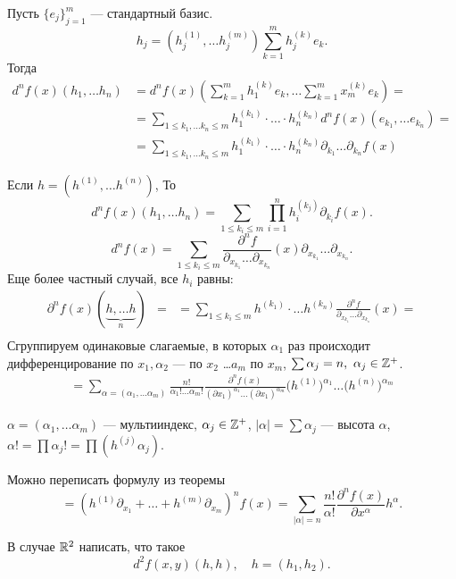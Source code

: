 \begin{thm}[частный случай, $ X = \R^{m} ~\R^{n}$]
    Пусть $ \{e_j\}_{j=1}^{m}$ --- стандартный базис.
    \[
	h_j = \left( h_j^{(1)}, \ldots h_j^{(m)} \right)  \sum_{k=1}^{m} h_{j}^{(k)} e_k 
    .\] 
    Тогда
	\[
	\begin{aligned}
	d^{n}f(x) (h_1, \ldots h_n) & = d^{n}f(x) \left( \sum_{k=1}^{m} h_1^{(k)} e_k, \ldots \sum_{k=1}^{m} x_m^{(k)}e_k \right) = \\
								&= \sum_{1 \le k_1, \ldots k_n \le m}^{} h_1^{(k_1)}\cdot  \ldots  \cdot h_n^{(k_n)} d^{n}f(x)(e_{k_1}, \ldots e_{k_n}) = \\
								&= \sum_{1 \le  k_1, \ldots k_n \le m}^{}  h_1^{(k_1)} \cdot \ldots \cdot h_n^{(k_n)} \partial _{k_1} \ldots \partial _{k_n}f(x)
	\end{aligned}
	\]
\end{thm}

\begin{thm}[еще более частный случай, $ X = \R^{m} , Y = \R, h_i = h_j$ ]
	Если $ h = (h^{(1)}, \ldots h^{(n)})$, То
    \[
		d^{n}f(x) (h_1, \ldots h_n) = \sum_{1 \le k_i \le m} \prod_{i=1}^{n} h_i^{(k_j)}\partial _{ k_i } f(x)
    .\] 
	\[
		d^{n}f(x) = \sum_{1 \le k_i \le m}^{} \frac{\partial ^{n} f}{\partial _{x_{k_1}} \ldots \partial _{x_{k_n}}} (x) \partial _{x_{k_1}} \ldots \partial _{x_{k_n}} 
	.\] 
	Еще более частный случай, все $ h_i$ равны:
	\[
	\begin{aligned}
		\partial ^{n} f(x) (\underbrace{h, \ldots h}_{n}) & = 
														  & = \sum_{1 \le k_i \le m}^{} h^{(k_1)} \cdot  \ldots h^{(k_n)}\frac{\partial ^{n} f}{\partial _{x_{k_1}} \ldots \partial _{ x_{k_n} } } (x) =\\
	\end{aligned}
    \] 
	Сгруппируем одинаковые слагаемые, в которых $ \alpha _1$ раз происходит дифференцирование по $ x_1, \alpha _2$ --- по $ x_2$  \ldots $ a_m$ по  $ x_m$, $ \sum \alpha _j = n, ~ \alpha _j \in \mathbb{Z}^{+} $.
	\[
	\begin{aligned}
=\sum_{\alpha = (\alpha _1, \ldots \alpha _m)} \frac{n!}{\alpha _1! \ldots \alpha _m!} \frac{\partial ^{n}f(x)}{(\partial x_1)^{\alpha _1} \ldots (\partial x_1)^{\alpha _m}}
\bigl(h^{(1)}\bigr)^{\alpha _1} \ldots \bigl(h^{(n)}\bigr)^{\alpha _m} 
\end{aligned}
\]
\end{thm}
\begin{name}
	$ \alpha  = (\alpha_1, \ldots \alpha _m)$ ---  {\sf мультииндекс}, $ \alpha _j \in  \mathbb{Z}^{+}$,
	$ \left| \alpha  \right| = \sum \alpha _j $ --- {\sf высота}  $ \alpha $,
    $ \alpha !  = \prod \alpha _j ! = \prod (h^{(j)}{\alpha _j})$.
\end{name}
Можно переписать формулу из теоремы
\[
    = \left(h^{(1)} \partial _{x_1} + \ldots + h^{(m)} \partial _{x_m}\right)^{n } f(x) =
	\sum_{\lvert \alpha \rvert = n }^{} \frac{n! }{\alpha !} \frac{\partial ^{n} f(x)}{\partial x^{\alpha }} h^{\alpha }
.\] 
\begin{prac}
    В случае $ \mathbb{R}^2$ написать, что такое
    \[
	d^2f(x, y)(h, h) , \quad h = (h_1, h_2)
    .\] 
\end{prac}
